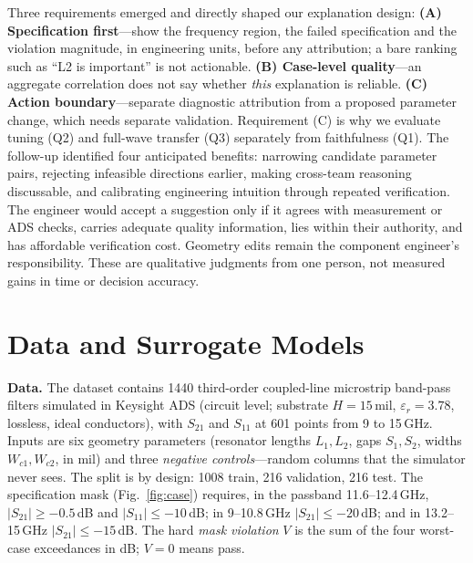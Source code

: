 \documentclass[conference,10pt]{IEEEtran}
\begin{document}
Three requirements emerged and directly shaped our explanation design:
\textbf{(A) Specification first}---show the frequency region, the failed specification and the violation magnitude, in engineering units, before any attribution; a bare ranking such as ``L2 is important'' is not actionable.
\textbf{(B) Case-level quality}---an aggregate correlation does not say whether \emph{this} explanation is reliable.
\textbf{(C) Action boundary}---separate diagnostic attribution from a proposed parameter change, which needs separate validation.
Requirement (C) is why we evaluate tuning (Q2) and full-wave transfer (Q3) separately from faithfulness (Q1).
The follow-up identified four anticipated benefits: narrowing candidate parameter pairs, rejecting infeasible directions earlier, making cross-team reasoning discussable, and calibrating engineering intuition through repeated verification. The engineer would accept a suggestion only if it agrees with measurement or ADS checks, carries adequate quality information, lies within their authority, and has affordable verification cost. Geometry edits remain the component engineer's responsibility. These are qualitative judgments from one person, not measured gains in time or decision accuracy.

\section{Data and Surrogate Models}
\textbf{Data.} The dataset contains 1440 third-order coupled-line microstrip band-pass filters simulated in Keysight ADS (circuit level; substrate $H=15$\,mil, $\varepsilon_r=3.78$, lossless, ideal conductors), with $S_{21}$ and $S_{11}$ at 601 points from 9 to 15\,GHz.
Inputs are six geometry parameters (resonator lengths $L_1,L_2$, gaps $S_1,S_2$, widths $W_{c1},W_{c2}$, in mil) and three \emph{negative controls}---random columns that the simulator never sees.
The split is by design: 1008 train, 216 validation, 216 test.
The specification mask (Fig.~\ref{fig:case}) requires, in the passband 11.6--12.4\,GHz, $|S_{21}|\ge-0.5$\,dB and $|S_{11}|\le-10$\,dB; in 9--10.8\,GHz $|S_{21}|\le-20$\,dB; and in 13.2--15\,GHz $|S_{21}|\le-15$\,dB.
The hard \emph{mask violation} $V$ is the sum of the four worst-case exceedances in dB; $V=0$ means pass.
\end{document}
